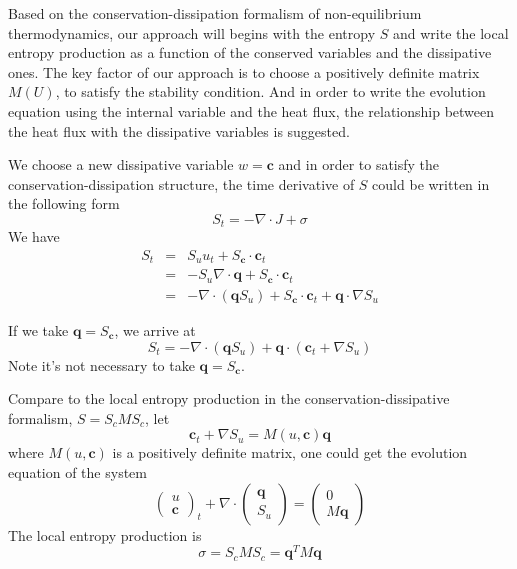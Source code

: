 \documentclass[a4paper]{article}
\begin{document}
Based on the conservation-dissipation formalism of non-equilibrium thermodynamics, our approach will begins with the entropy $S$ and write the local entropy production as a function of the conserved variables and the dissipative ones. The key factor of our approach is to choose a positively definite matrix $M(U)$, to satisfy the stability condition. And in order to write the evolution equation using the internal variable and the heat flux, the relationship between the heat flux with the dissipative variables is suggested. 

We choose a new dissipative variable $w=\mathbf{c}$ and in order to satisfy the conservation-dissipation structure, the time derivative of $S$ could be written in the following form
\begin{equation}\label{St}
S_t=-\nabla \cdot J+\sigma
\end{equation}
We have
\begin{eqnarray}
S_t &=& S_u u_t + S_\mathbf{c} \cdot \mathbf{c}_t \\
 &=& -S_u \nabla \cdot \mathbf{q} +S_\mathbf{c} \cdot \mathbf{c}_t\\
&=& -\nabla \cdot(\mathbf{q}S_u)+S_\mathbf{c} \cdot \mathbf{c}_t+\mathbf{q} \cdot \nabla S_u
\end{eqnarray}

If we take $\mathbf{q}= S_\mathbf{c}$, we arrive at
\begin{equation}
S_t = -\nabla \cdot(\mathbf{q} S_u)+\mathbf{q} \cdot (\mathbf{c}_t+\nabla S_u)
\end{equation}
Note it's not necessary to take $\mathbf{q}=S_\mathbf{c}$. 

Compare to the local entropy production in the conservation-dissipative formalism, $S=S_c M S_c$, let
\begin{equation}
\mathbf{c}_t+ \nabla S_u=M(u,\mathbf{c}) \mathbf{q}
\end{equation}
where $M(u,\mathbf{c})$ is a positively definite matrix, one could get the evolution equation of the system
\begin{equation}
\left( \begin{array}{ll} u \\ \mathbf{c} \end{array} \right)_t + \nabla \cdot \left( \begin{array}{ll} \mathbf{q} \\ S_u \end{array} \right) = \left( \begin{array}{ll} 0 \\ M \mathbf{q} \end{array} \right)
\end{equation}
The local entropy production is
\begin{equation}
\sigma = S_c M S_c =\mathbf{q}^T M \mathbf{q}
\end{equation}
\end{document}
